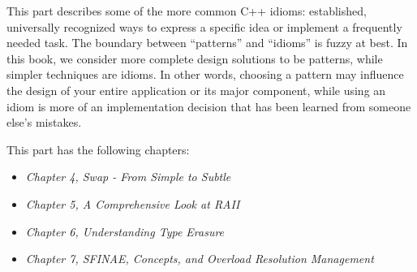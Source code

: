 This part describes some of the more common C++ idioms: established, universally recognized ways to express a specific idea or implement a frequently needed task. The boundary between ``patterns'' and ``idioms'' is fuzzy at best. In this book, we consider more complete design solutions to be patterns, while simpler techniques are idioms. In other words, choosing a pattern may influence the design of your entire application or its major component, while using an idiom is more of an implementation decision that has been learned from someone else's mistakes.

This part has the following chapters:

\begin{itemize}
\item
  \emph{Chapter 4, Swap - From Simple to Subtle}
\item
  \emph{Chapter 5, A Comprehensive Look at RAII}
\item
  \emph{Chapter 6, Understanding Type Erasure}
\item
  \emph{Chapter 7, SFINAE, Concepts, and Overload Resolution Management}
\end{itemize}

